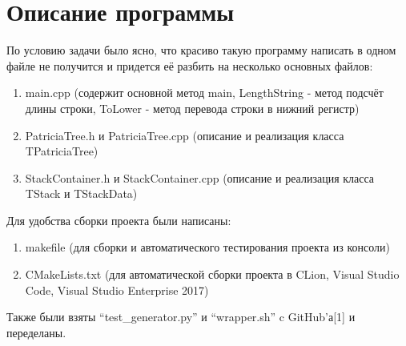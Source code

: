 \documentclass[pdf, unicode, 12pt, a4paper,oneside,fleqn]{article}
\begin{document}
\newpage 
\section{Описание программы}
По условию задачи было ясно, что красиво такую программу написать в одном файле не получится и придется её разбить на несколько основных файлов:
\begin{enumerate}
\item main.cpp (содержит основной метод main, LengthString - метод подсчёт длины строки, ToLower - метод перевода строки в нижний регистр)
\item PatriciaTree.h и PatriciaTree.cpp (описание и реализация класса TPatriciaTree)
\item StackContainer.h и StackContainer.cpp (описание и реализация класса TStack и TStackData)
\end{enumerate}
Для удобства сборки проекта были написаны: 
\begin{enumerate}
\item makefile (для сборки и автоматического тестирования проекта из консоли)
\item CMakeLists.txt (для автоматической сборки проекта в CLion, Visual Studio Code, Visual Studio Enterprise 2017)
\end{enumerate}
Также были взяты \enquote{test\_generator.py} и \enquote{wrapper.sh} c GitHub'а[1] и переделаны.
\newpage
\end{document}
